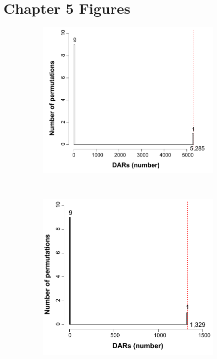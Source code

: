 \clearpage

\section{Chapter 5 Figures}

\bigskip
\begin{figure}[htbp]
\centering
\begin{subfigure}[b]{0.45\textwidth}
\centering 
\includegraphics[width=\textwidth]{./Appendix/pdfs/Chapter5/ATAC_PsA_CD14_permutation_analysis}
\caption{}
\end{subfigure}
~
\begin{subfigure}[b]{0.45\textwidth}
\centering 
\includegraphics[width=\textwidth]{./Appendix/pdfs/Chapter5/ATAC_PsA_CD4_permutation_analysis}

\end{subfigure}
\end{figure}
